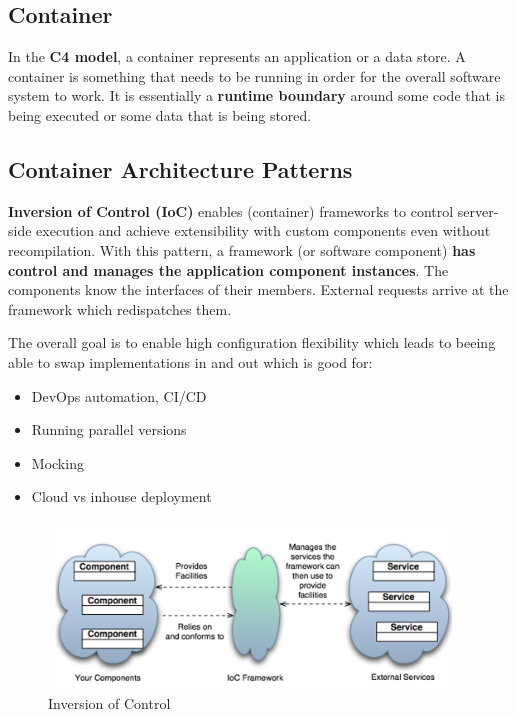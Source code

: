 \documentclass[../Main.tex]{subfiles}
\begin{document}
\subsection{Container}

In the \textbf{C4 model}, a container represents an application or a data store.
A container is something that needs to be running in order for the overall software system to work.
It is essentially a \textbf{runtime boundary} around some code that is
being executed or some data that is being stored.

\subsection{Container Architecture Patterns}
\textbf{Inversion of Control (IoC)} enables (container) frameworks to control server-side execution
and achieve extensibility with custom components even without recompilation.
With this pattern, a framework (or software component) \textbf{has control and manages the application component instances}.
The components know the interfaces of their members.
External requests arrive at the framework which redispatches them.

The overall goal is to enable high configuration flexibility
which leads to beeing able to swap implementations in and out which
is good for:
\begin{itemize}
    \item DevOps automation, CI/CD
    \item Running parallel versions
    \item Mocking
    \item Cloud vs inhouse deployment
\end{itemize}

\begin{figure}[H]
    \centering
    \includegraphics[width=1\linewidth]{Images/ioc.png}
    \caption{Inversion of Control}
\end{figure}
\end{document}
